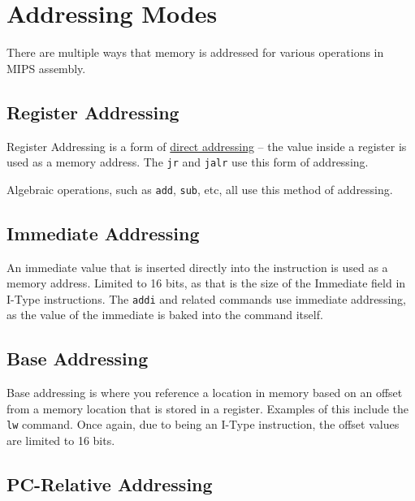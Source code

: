 \documentclass{article}
\begin{document}
\section{Addressing Modes}\label{Addressing}

There are multiple ways that memory is addressed for various operations in MIPS assembly. 


\subsection{Register Addressing}\label{Register Addressing}

Register Addressing is a form of \underline{direct addressing} -- the value inside a register is used as a memory address. The \texttt{jr} and \texttt{jalr} use this form of addressing. 

Algebraic operations, such as \texttt{add}, \texttt{sub}, etc, all use this method of addressing. 


\subsection{Immediate Addressing}\label{Immediate Addressing}

An immediate value that is inserted directly into the instruction is used as a memory address. Limited to 16 bits, as that is the size of the Immediate field in I-Type instructions. The \texttt{addi} and related commands use immediate addressing, as the value of the immediate is baked into the command itself. 


\subsection{Base Addressing}\label{Base Addressing}

Base addressing is where you reference a location in memory based on an offset from a memory location that is stored in a register. Examples of this include the \texttt{lw} command. Once again, due to being an I-Type instruction, the offset values are limited to 16 bits. 


\subsection{PC-Relative Addressing}\label{PC-Relative Addressing}
\end{document}
